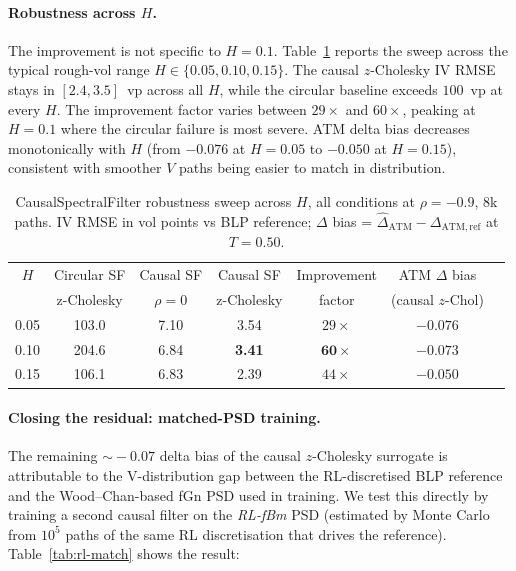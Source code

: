 \documentclass[11pt,a4paper]{article}
\begin{document}
\paragraph{Robustness across $H$.}
The improvement is not specific to $H = 0.1$.
Table~\ref{tab:causal-hurst} reports the sweep across the typical
rough-vol range $H \in \{0.05, 0.10, 0.15\}$. The causal $z$-Cholesky
IV RMSE stays in $[2.4, 3.5]$~vp across all $H$, while the circular
baseline exceeds $100$~vp at every $H$. The improvement factor
varies between $29\times$ and $60\times$, peaking at $H=0.1$ where the
circular failure is most severe. ATM delta bias decreases monotonically
with $H$ (from $-0.076$ at $H=0.05$ to $-0.050$ at $H=0.15$), consistent
with smoother $V$ paths being easier to match in distribution.

\begin{table}[h]
\centering
\caption{CausalSpectralFilter robustness sweep across $H$, all conditions
at $\rho=-0.9$, 8k paths. IV RMSE in vol points vs BLP reference;
$\Delta$ bias = $\hat\Delta_{\mathrm{ATM}} - \Delta_{\mathrm{ATM,ref}}$ at $T=0.50$.}
\label{tab:causal-hurst}
\begin{tabular}{ccccccc}
\toprule
$H$ & Circular SF & Causal SF & Causal SF & Improvement & ATM $\Delta$ bias \\
  & z-Cholesky & $\rho=0$ & z-Cholesky & factor   & (causal $z$-Chol) \\
\midrule
0.05 & 103.0 & 7.10 & 3.54 & $29\times$ & $-0.076$ \\
0.10 & 204.6 & 6.84 & \textbf{3.41} & $\mathbf{60\times}$ & $-0.073$ \\
0.15 & 106.1 & 6.83 & 2.39 & $44\times$ & $-0.050$ \\
\bottomrule
\end{tabular}
\end{table}

\paragraph{Closing the residual: matched-PSD training.}
The remaining $\sim\!-0.07$ delta bias of the causal $z$-Cholesky
surrogate is attributable to the V-distribution gap between the
RL-discretised BLP reference and the Wood--Chan-based fGn PSD used in
training. We test this directly by training a second causal filter on
the \emph{RL-fBm} PSD (estimated by Monte Carlo from $10^5$ paths of the
same RL discretisation that drives the reference). Table~\ref{tab:rl-match}
shows the result:
\end{document}
